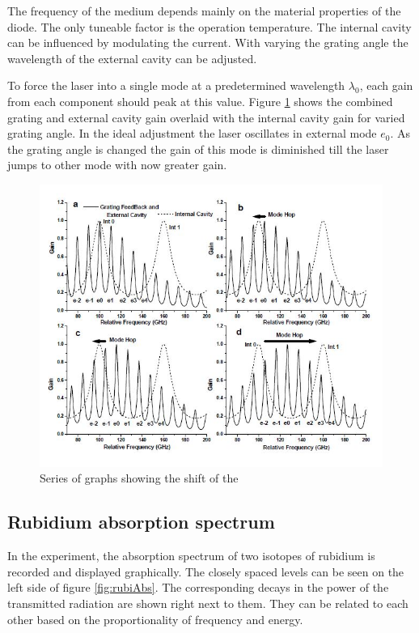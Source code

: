 The frequency of the medium depends mainly on the material properties of the diode. The only tuneable factor is the operation temperature.
The internal cavity can be influenced by modulating the current.
With varying the grating angle the wavelength of the external cavity can be adjusted.

To force the laser into a single mode at a predetermined wavelength $\lambda_0$, each gain from each component should peak at this value. 
Figure \ref{fig:mode} shows the combined grating and external cavity gain overlaid with the internal cavity gain for varied grating angle. In the ideal adjustment the laser oscillates in external mode $e_0$. As the grating angle is changed the gain of this mode is diminished till the laser jumps to other mode with now greater gain.

\begin{figure}
    \centering
    \includegraphics[width=\textwidth]{content/mode.jpg}
    \caption{Series of graphs showing the shift of the  \cite{Anleitung}}
    \label{fig:mode}
  \end{figure}

\subsection{Rubidium absorption spectrum}
\label{sec:rubiAbs}


In the experiment, the absorption spectrum of two isotopes of rubidium is recorded and displayed graphically. 
The closely spaced levels can be seen on the left side of figure \ref{fig:rubiAbs}. The corresponding decays in the power of the transmitted radiation are shown right next to them. They can be related to each other based on the proportionality of frequency and energy.

